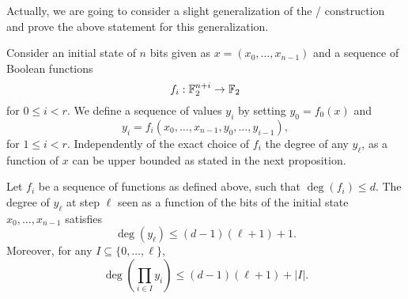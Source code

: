Actually, we are going to consider a slight generalization of the \WSN/ construction and prove the above statement for this generalization.

Consider an initial state of $n$ bits given as $x=(x_0,\dots,x_{n-1})$ and a sequence of Boolean functions
\begin{equation*}
    f_i :\mathbb{F}_2^{n+i} \to \mathbb{F}_2
\end{equation*}
for $0 \leqslant i < r$. We define a sequence of values $y_i$  by setting $y_0=f_0(x)$ and
\begin{equation*}
    y_i=f_i(x_0,\dots,x_{n-1},y_0, \dots, y_{i-1}),
\end{equation*}
for $1 \leqslant i < r$.
Independently of the exact choice of $f_i$ the degree of any $y_\ell$, as a function of $x$ can be upper bounded as stated in the next proposition.
\begin{proposition}\label{bison:prop:degree}
    Let $f_i$ be a sequence of functions as defined above, such that $\deg(f_i)\leqslant d$.
    The degree of $y_\ell$ at step $\ell$ seen as a function of the bits of the initial state $x_0,\dots,x_{n-1}$ satisfies
    \begin{equation*}
        \deg(y_\ell)\leqslant (d-1)(\ell+1)+1.
    \end{equation*}
    Moreover, for any $I \subseteq \{0,\dots, \ell\}$,
    \begin{equation*}
        \deg(\prod_{i \in I} y_i)\leqslant (d-1)(\ell+1)+ |I|.
    \end{equation*}
\end{proposition}
